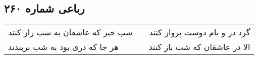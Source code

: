 \begin{center}
\section*{رباعی شماره ۲۶۰}
\label{sec:sh260}
\begin{longtable}{l p{0.5cm} r}
شب خیز که عاشقان به شب راز کنند
&&
گرد در و بام دوست پرواز کنند
\\
هر جا که دری بود به شب بربندند
&&
الا در عاشقان که شب باز کنند
\\
\end{longtable}
\end{center}

